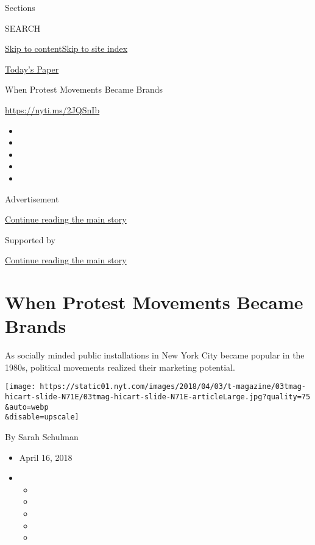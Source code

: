 Sections

SEARCH

\protect\hyperlink{site-content}{Skip to
content}\protect\hyperlink{site-index}{Skip to site index}

\href{https://myaccount.nytimes.com/auth/login?response_type=cookie\&client_id=vi}{}

\href{https://www.nytimes.com/section/todayspaper}{Today's Paper}

When Protest Movements Became Brands

\href{https://nyti.ms/2JQSnIb}{https://nyti.ms/2JQSnIb}

\begin{itemize}
\item
\item
\item
\item
\item
\end{itemize}

Advertisement

\protect\hyperlink{after-top}{Continue reading the main story}

Supported by

\protect\hyperlink{after-sponsor}{Continue reading the main story}

\hypertarget{when-protest-movements-became-brands}{%
\section{When Protest Movements Became
Brands}\label{when-protest-movements-became-brands}}

As socially minded public installations in New York City became popular
in the 1980s, political movements realized their marketing potential.

\texttt{[image: https://static01.nyt.com/images/2018/04/03/t-magazine/03tmag-hicart-slide-N71E/03tmag-hicart-slide-N71E-articleLarge.jpg?quality=75\\\&auto=webp\\\&disable=upscale]}

By Sarah Schulman

\begin{itemize}
\item
  April 16, 2018
\item
  \begin{itemize}
  \item
  \item
  \item
  \item
  \item
  \end{itemize}
\end{itemize}

